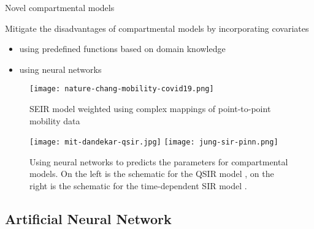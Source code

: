 \begin{frame}[allowframebreaks]{Novel compartmental models}

    Mitigate the disadvantages of compartmental models by incorporating covariates
    \begin{itemize}
        \item using predefined functions based on domain knowledge
        \item using neural networks
    \end{itemize}

    \framebreak

    \begin{figure}[!htb]
        \centering
        \texttt{[image: nature-chang-mobility-covid19.png]}
        \caption[SEIR model weighted using complex mappings of point-to-point mobility data]{SEIR model weighted using complex mappings of point-to-point mobility data \cite{changMobilityNetworkModels2021}}
        \label{fig:nature-chang-mobility-covid19}
    \end{figure}

    \begin{figure}[!htb]
        \centering
        \texttt{[image: mit-dandekar-qsir.jpg]}
        \texttt{[image: jung-sir-pinn.png]}
        \caption[Using neural networks to predicts the parameters for compartmental models]{Using neural networks to predicts the parameters for compartmental models. On the left is the schematic for the QSIR model \cite{dandekarMachineLearningAidedGlobal2020a}, on the right is the schematic for the time-dependent SIR model \cite{jungRealWorldImplicationsRapidly2020}.}
        \label{fig:compartmentals-models-with-neural-networks}
    \end{figure}

\end{frame}

\subsection{Artificial Neural Network}

